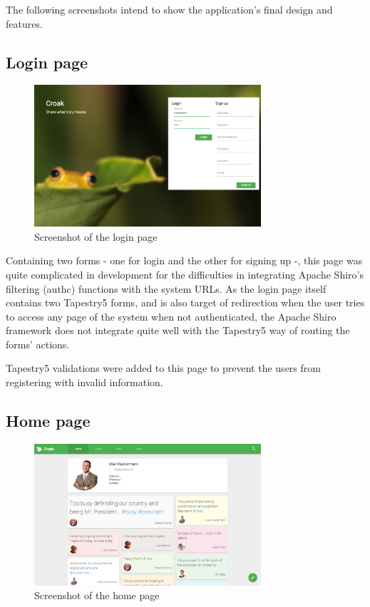 \documentclass[paper=a4, fontsize=12pt]{scrartcl}
\numberwithin{equation}{section}    %
\numberwithin{figure}{section}      %
\numberwithin{table}{section}        %
\begin{document}
The following screenshots intend to show the application's final design and features.

\subsection{Login page}
\begin{figure}[H]
  \begin{center}
    \includegraphics[width=0.75\textwidth]{screenshots/login}
  \end{center}
  \caption{Screenshot of the login page}
\end{figure}

Containing two forms - one for login and the other for signing up -, this page was
quite complicated in development for the difficulties in integrating Apache Shiro's
filtering (authc) functions with the system URLs. As the login page itself contains two Tapestry5 forms,
and is also target of redirection when the user tries to access any page of the system
when not authenticated, the Apache Shiro framework does not integrate quite well with the
Tapestry5 way of routing the forms' actions.

Tapestry5 validations were added to this page to prevent the users from registering with invalid information.

\subsection{Home page}
\begin{figure}[H]
  \begin{center}
    \includegraphics[width=0.75\textwidth]{screenshots/home}
  \end{center}
  \caption{Screenshot of the home page}
\end{figure}
\end{document}

